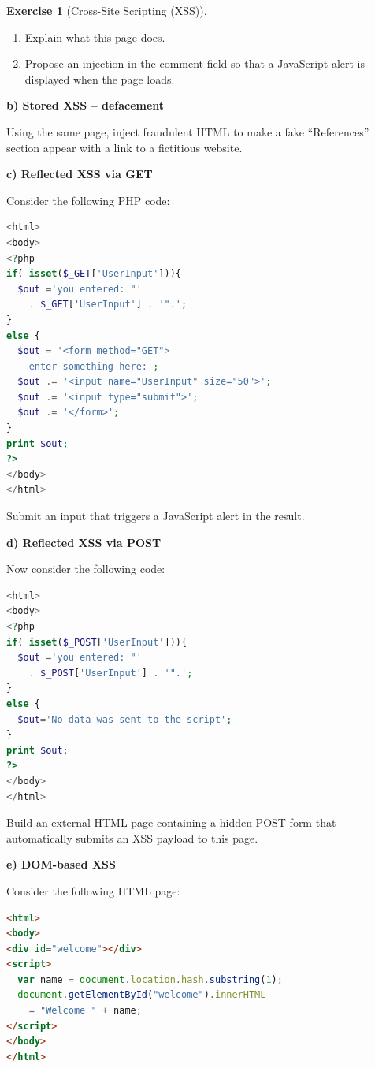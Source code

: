 \documentclass[a4paper,11pt]{article}
\theoremstyle{plain}
\theoremstyle{definition}
\newtheorem{exercice}{Exercise}
\begin{document}
\begin{exercice}[Cross-Site Scripting (XSS)]
\begin{enumerate}
    \item Explain what this page does.
    \item Propose an injection in the comment field so that a JavaScript alert is displayed when the page loads.
\end{enumerate}

\medskip

\textbf{b) Stored XSS -- defacement}

\medskip

Using the same page, inject fraudulent HTML to make a fake ``References'' section appear with a link to a fictitious website.

\medskip

\textbf{c) Reflected XSS via GET}

\medskip

Consider the following PHP code:

\begin{lstlisting}[language=PHP]
<html>
<body>
<?php
if( isset($_GET['UserInput'])){
  $out ='you entered: "'
    . $_GET['UserInput'] . '".';
}
else {
  $out = '<form method="GET">
    enter something here:';
  $out .= '<input name="UserInput" size="50">';
  $out .= '<input type="submit">';
  $out .= '</form>';
}
print $out;
?>
</body>
</html>
\end{lstlisting}

Submit an input that triggers a JavaScript alert in the result.

\medskip

\textbf{d) Reflected XSS via POST}

\medskip

Now consider the following code:

\begin{lstlisting}[language=PHP]
<html>
<body>
<?php
if( isset($_POST['UserInput'])){
  $out ='you entered: "'
    . $_POST['UserInput'] . '".';
}
else {
  $out='No data was sent to the script';
}
print $out;
?>
</body>
</html>
\end{lstlisting}

Build an external HTML page containing a hidden POST form that automatically submits an XSS payload to this page.

\medskip

\textbf{e) DOM-based XSS}

\medskip

Consider the following HTML page:

\begin{lstlisting}[language=HTML]
<html>
<body>
<div id="welcome"></div>
<script>
  var name = document.location.hash.substring(1);
  document.getElementById("welcome").innerHTML
    = "Welcome " + name;
</script>
</body>
</html>
\end{lstlisting}


\end{exercice}
\end{document}
